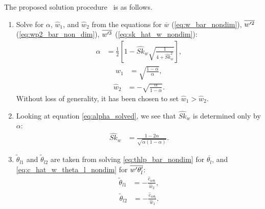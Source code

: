 The proposed solution procedure~\autocite{larson2005using} is as follows.
\begin{enumerate}
    \item Solve for $\alpha$, $\widehat{w}_1$,
    and $\widehat{w}_2$ from the equations for $\overline{w}$ (\cref{eq:w_bar_nondim}),
    $\overline{w'^2}$ (\cref{eq:wp2_bar_non_dim}), $\overline{w'^3}$ (\cref{eq:sk_hat_w_nondim}):
    \begin{align}
        \label{eq:alpha_solved}
        \alpha
        &= \frac{1}{2}\left[1 - \widehat{Sk}_w \sqrt{\frac{1}{4 + \widehat{Sk}_w^2}}\right],
    \end{align}
    \begin{align}
        \label{eq:w1_solved}
        \widehat{w}_1
        &= \sqrt{\frac{1-\alpha}{\alpha}},
    \end{align}
    \begin{align}
        \label{eq:w2_solved}
        \widehat{w}_2
        &= -\sqrt{\frac{\alpha}{1-\alpha}}.
    \end{align}
    Without loss of generality, it has been chosen to set $\widehat{w}_1 > \widehat{w}_2$.

    \item Looking at equation \cref{eq:alpha_solved},
    we see that $\widehat{Sk}_w$ is determined only by $\alpha$:
    \begin{align}
        \label{eq:sk_w_alpha}
        \widehat{Sk}_w
        &= \frac{1-2\alpha}{\sqrt{\alpha(1-\alpha)}}.
    \end{align}

    \item $\tilde{\theta}_{l1}$ and $\tilde{\theta}_{l2}$ are taken from solving \cref{eq:thlp_bar_nondim}
    for $\overline{\theta_l}$, and \cref{eq:c_hat_w_theta_l_nondim} for $\overline{w' \theta_l'}$:
    \begin{align}
        \label{eq:thl1_tilde_solved}
        \tilde{\theta}_{l1}
        &= -\frac{\widehat{c}_{w \theta_l}}{\widehat{w}_2},
    \end{align}
    \begin{align}
        \label{eq:thl2_tilde_solved}
        \tilde{\theta}_{l2}
        &= -\frac{\widehat{c}_{w \theta_l}}{\widehat{w}_1}.
    \end{align}


\end{enumerate}
